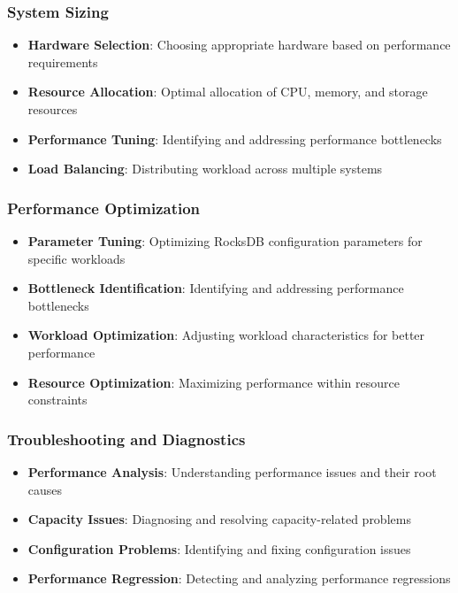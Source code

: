 \documentclass[11pt]{article}
\begin{document}
\subsubsection{System Sizing}
\begin{itemize}
    \item \textbf{Hardware Selection}: Choosing appropriate hardware based on performance requirements
    \item \textbf{Resource Allocation}: Optimal allocation of CPU, memory, and storage resources
    \item \textbf{Performance Tuning}: Identifying and addressing performance bottlenecks
    \item \textbf{Load Balancing}: Distributing workload across multiple systems
\end{itemize}

\subsubsection{Performance Optimization}
\begin{itemize}
    \item \textbf{Parameter Tuning}: Optimizing RocksDB configuration parameters for specific workloads
    \item \textbf{Bottleneck Identification}: Identifying and addressing performance bottlenecks
    \item \textbf{Workload Optimization}: Adjusting workload characteristics for better performance
    \item \textbf{Resource Optimization}: Maximizing performance within resource constraints
\end{itemize}

\subsubsection{Troubleshooting and Diagnostics}
\begin{itemize}
    \item \textbf{Performance Analysis}: Understanding performance issues and their root causes
    \item \textbf{Capacity Issues}: Diagnosing and resolving capacity-related problems
    \item \textbf{Configuration Problems}: Identifying and fixing configuration issues
    \item \textbf{Performance Regression}: Detecting and analyzing performance regressions
\end{itemize}
\end{document}
